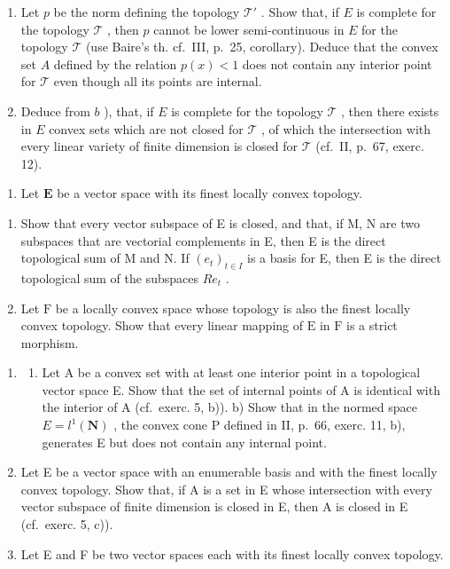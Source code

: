 \begin{enumerate}
\def\labelenumi{\alph{enumi})}
\setcounter{enumi}{1}
\item
  Let \(p\) be the norm defining the topology \(\mathcal{T}'\) . Show that, if \(E\) is complete for the topology \(\mathcal{T}\) , then \(p\) cannot be lower semi-continuous in \(E\) for the topology \(\mathcal{T}\) (use Baire's th. cf.~III, p.~25, corollary). Deduce that the convex set \(A\) defined by the relation \(p(x) < 1\) does not contain any interior point for \(\mathcal{T}\) even though all its points are internal.
\item
  Deduce from \(b\) ), that, if \(E\) is complete for the topology \(\mathcal{T}\) , then there exists in \(E\) convex sets which are not closed for \(\mathcal{T}\) , of which the intersection with every linear variety of finite dimension is closed for \(\mathcal{T}\) (cf.~II, p.~67, exerc. 12).
\end{enumerate}

\begin{enumerate}
\def\labelenumi{\arabic{enumi})}
\setcounter{enumi}{5}
\tightlist
\item
  Let \(\mathbf{E}\) be a vector space with its finest locally convex topology.
\end{enumerate}

\begin{enumerate}
\def\labelenumi{\alph{enumi})}
\item
  Show that every vector subspace of E is closed, and that, if M, N are two subspaces that are vectorial complements in E, then E is the direct topological sum of M and N. If \((e_{t})_{t\in I}\) is a basis for E, then E is the direct topological sum of the subspaces \(Re_{t}\) .
\item
  Let \(\mathrm{F}\) be a locally convex space whose topology is also the finest locally convex topology. Show that every linear mapping of \(\mathrm{E}\) in \(\mathrm{F}\) is a strict morphism.
\end{enumerate}

\begin{enumerate}
\def\labelenumi{\arabic{enumi})}
\setcounter{enumi}{6}
\item
  \begin{enumerate}
  \def\labelenumii{\alph{enumii})}
  \tightlist
  \item
    Let A be a convex set with at least one interior point in a topological vector space E. Show that the set of internal points of A is identical with the interior of A (cf.~exerc. 5, b)). b) Show that in the normed space \(E = l^{1}(\mathbf{N})\) , the convex cone P defined in II, p.~66, exerc. 11, b), generates E but does not contain any internal point.
  \end{enumerate}
\item
  Let E be a vector space with an enumerable basis and with the finest locally convex topology. Show that, if A is a set in E whose intersection with every vector subspace of finite dimension is closed in E, then A is closed in E (cf.~exerc. 5, c)).
\item
  Let E and F be two vector spaces each with its finest locally convex topology.
\end{enumerate}

